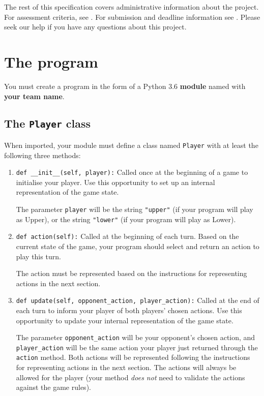 \documentclass[]{article}
\begin{document}
The rest of this specification covers administrative information about
the project.
%
For assessment criteria, see .
%
For submission and deadline information see .
%
Please seek our help if you have any questions about this project.



\newpage

\section{The program}
\label{sec:program}

You must create a program in the form of a Python 3.6 \textbf{module}
named with \textbf{your team name}.


\subsection{\texorpdfstring{The \texttt{Player} class}{The Player class}}

When imported, your module must define a class named \texttt{Player}
with at least the following three methods:

\begin{enumerate}
    \item
        \texttt{def\ \_\_init\_\_(self,\ player):}
        Called once at the beginning of a game to initialise your player.
        Use this opportunity to set up an internal representation of the
        game state.

        The parameter \texttt{player} will be
        the string \texttt{"upper"} (if your program will play as Upper),
        or the string \texttt{"lower"} (if your program will play as Lower).
    \item
        \texttt{def\ action(self):}
        Called at the beginning of each turn. 
        Based on the current state of the game, your program should select
        and return an action to play this turn.

        The action must be represented based on the instructions
        for representing actions in the next section.
    \item
        \texttt{def\ update(self,\ opponent\_action,\ player\_action):}
        Called at the end of each turn to inform your player of both
        players' chosen actions.
        Use this opportunity to update your internal representation of the
        game state.

        The parameter \texttt{opponent\_action} will be your opponent's
        chosen action, and \texttt{player\_action} will be the same action
        your player just returned through the
        \texttt{action} method.
        Both actions will be represented following the instructions for
        representing actions in the next section. The actions will always
        be allowed for the player 
        (your method \emph{does not} need to validate the actions against
        the game rules).
\end{enumerate}
\end{document}
